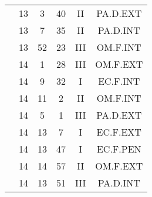 \documentclass[12pt, a4paper]{article}
\begin{document}
\begin{multicols}{3}
{\begin{tabular}{c c c c c c}
	 	 	 	 & 13 & 3 & 40 & II & PA.D.EXT\\%
	 	 	 	 & 13 & 7 & 35 & II & PA.D.INT\\%
	 	 	 	 & 13 & 52 & 23 & III & OM.F.INT\\%
	 	 	 	 & 14 & 1 & 28 & III & OM.F.EXT\\%
	 	 	 	 & 14 & 9 & 32 & I & EC.F.INT\\%
	 	 	 	 & 14 & 11 & 2 & II & OM.F.INT\\%
	 	 	 	 & 14 & 5 & 1 & III & PA.D.EXT\\%
	 	 	 	 & 14 & 13 & 7 & I & EC.F.EXT\\%
	 	 	 	 & 14 & 13 & 47 & I & EC.F.PEN\\%
	 	 	 	 & 14 & 14 & 57 & II & OM.F.EXT\\%
	 	 	 	 & 14 & 13 & 51 & III & PA.D.INT\\%
	 	 \end{tabular}
 	}
\end{multicols}
\end{document}
